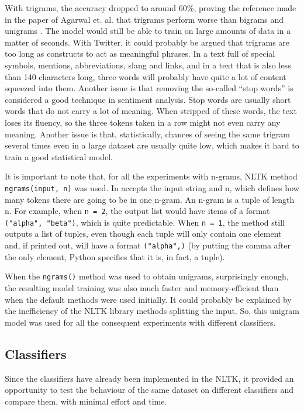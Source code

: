 With trigrams, the accuracy dropped to around 60\%, proving the reference made in the paper of Agarwal et. al. that trigrams perform worse than bigrams and unigrams \cite{agarwal2011sentiment}. The model would still be able to train on large amounts of data in a matter of seconds. With Twitter, it could probably be argued that trigrams are too long as constructs to act as meaningful phrases. In a text full of special symbols, mentions, abbreviations, slang and links, and in a text that is also less than 140 characters long, three words will probably have quite a lot of content squeezed into them. Another issue is that removing the so-called ``stop words'' is considered a good technique in sentiment analysis. Stop words are usually short words that do not carry a lot of meaning. When stripped of these words, the text loses its fluency, so the three tokens taken in a row might not even carry any meaning. Another issue is that, statistically, chances of seeing the same trigram several times even in a large dataset are usually quite low, which makes it hard to train a good statistical model.

It is important to note that, for all the experiments with n-grams, NLTK method \\ \texttt{ngrams(input, n)} was used. In accepts the input string and n, which defines how many tokens there are going to be in one n-gram. An n-gram is a tuple of length n. For example, when \texttt{n = 2}, the output list would have items of a format \texttt{("alpha", "beta")}, which is quite predictable. When \texttt{n = 1}, the method still outputs a list of tuples, even though each tuple will only contain one element and, if printed out, will have a format \texttt{("alpha",)} (by putting the comma after the only element, Python specifies that it is, in fact, a tuple). 

When the \texttt{ngrams()} method was used to obtain unigrams, surprisingly enough, the resulting model training was also much faster and memory-efficient than when the default methods were used initially. It could probably be explained by the inefficiency of the NLTK library methods splitting the input. So, this unigram model was used for all the consequent experiments with different classifiers. 

\subsection{Classifiers}
Since the classifiers have already been implemented in the NLTK, it provided an opportunity to test the behaviour of the same dataset on different classifiers and compare them, with minimal effort and time. 
